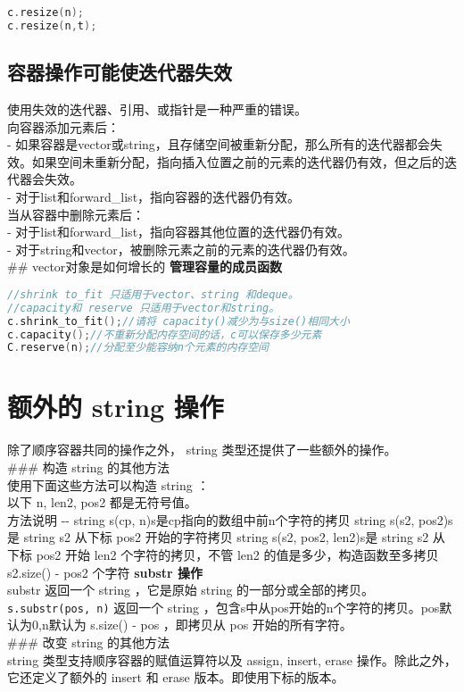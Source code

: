 \documentclass[
  a4paper,
  oneside,tablecaptionabove
]{scrbook}
\begin{document}
\begin{lstlisting}[language={C++}]
c.resize(n);
c.resize(n,t);
\end{lstlisting}

\subsection{容器操作可能使迭代器失效}\label{ux5bb9ux5668ux64cdux4f5cux53efux80fdux4f7fux8fedux4ee3ux5668ux5931ux6548}

使用失效的迭代器、引用、或指针是一种严重的错误。\\
向容器添加元素后：\\
-
如果容器是vector或string，且存储空间被重新分配，那么所有的迭代器都会失效。如果空间未重新分配，指向插入位置之前的元素的迭代器仍有效，但之后的迭代器会失效。\\
- 对于list和forward\_list，指向容器的迭代器仍有效。\\
当从容器中删除元素后：\\
- 对于list和forward\_list，指向容器其他位置的迭代器仍有效。\\
- 对于string和vector，被删除元素之前的元素的迭代器仍有效。\\
\#\# vector对象是如何增长的 \textbf{管理容量的成员函数}

\begin{lstlisting}[language={C++}]
//shrink to_fit 只适用于vector、string 和deque。
//capacity和 reserve 只适用于vector和string。
c.shrink_to_fit();//请将 capacity()减少为与size()相同大小
c.capacity();//不重新分配内存空间的话，c可以保存多少元素
C.reserve(n);//分配至少能容纳n个元素的内存空间
\end{lstlisting}

\section{额外的 string
操作}\label{ux989dux5916ux7684-string-ux64cdux4f5c}

除了顺序容器共同的操作之外， string 类型还提供了一些额外的操作。\\
\#\#\# 构造 string 的其他方法\\
使用下面这些方法可以构造 string ：\\
以下 n, len2, pos2 都是无符号值。\\
\textbar{}方法\textbar{}说明\textbar{} \textbar{}-\textbar{}-\textbar{}
\textbar{}string s(cp,
n)\textbar{}s是cp指向的数组中前n个字符的拷贝\textbar{} \textbar{}string
s(s2, pos2)\textbar{}s是 string s2 从下标 pos2 开始的字符拷贝\textbar{}
\textbar{}string s(s2, pos2, len2)\textbar{}s是 string s2 从下标 pos2
开始 len2 个字符的拷贝，不管 len2 的值是多少，构造函数至多拷贝 s2.size()
- pos2 个字符\textbar{} \textbf{substr 操作}\\
substr 返回一个 string ，它是原始 string 的一部分或全部的拷贝。\\
\lstinline!s.substr(pos, n)! 返回一个 string
，包含s中从pos开始的n个字符的拷贝。pos默认为0,n默认为 s.size() - pos
，即拷贝从 pos 开始的所有字符。\\
\#\#\# 改变 string 的其他方法\\
string 类型支持顺序容器的赋值运算符以及 assign, insert, erase
操作。除此之外，它还定义了额外的 insert 和 erase
版本。即使用下标的版本。
\end{document}
